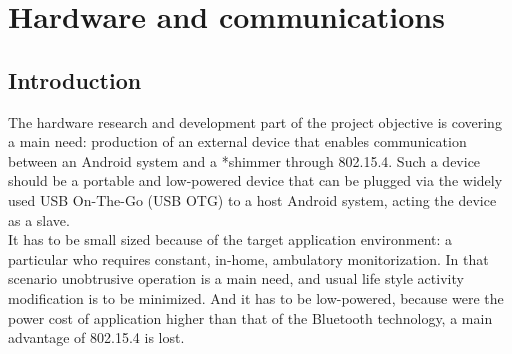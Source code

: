 \chapter{Hardware and communications}
\label{ch:hardware}
	\section{Introduction}	





	The hardware research and development part of the project objective is covering a main need: production of an external device that enables communication between an Android system and a *shimmer through 802.15.4. Such a device should be a portable and low-powered device that can be plugged via the widely used USB On-The-Go (USB OTG) to a host Android system, acting the device as a slave.\\

	It has to be small sized because of the target application environment: a particular who requires constant, in-home, ambulatory monitorization. 
	In that scenario unobtrusive operation is a main need, and usual life style activity modification is to be minimized. And it has to be low-powered, because were the power cost of application higher than that of the Bluetooth technology, a main advantage of 802.15.4 is lost.\\ 

